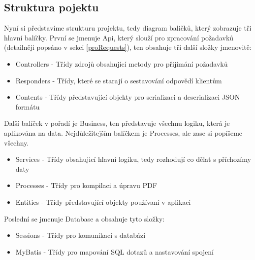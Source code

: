 \subsection{Struktura pojektu}
Nyní si představíme strukturu projektu, tedy diagram baličků, který zobrazuje tři hlavní balíčky. První se jmenuje Api, který slouží pro zpracování požadavků (detailněji popsáno v sekci \ref{proRequests}), ten obsahuje tři další složky jmenovitě:
\begin{itemize}
	\item Controllers - Třídy zdrojů obsahující metody pro přijímání požadavků
	\item Responders - Třídy, které se starají o sestavování odpovědí klientům
	\item Contents - Třídy představující objekty pro serializaci a deserializaci JSON formátu
\end{itemize}
Další balíček v pořadí je Business, ten představuje všechnu logiku, která je aplikována na data. Nejdůležitejším balíčkem je Processes, ale zase si popíšeme všechny.
\begin{itemize}
	\item Services - Třídy obsahujicí hlavní logiku, tedy rozhodují co dělat s příchozímy daty
	\item Processes - Třídy pro kompilaci a úpravu PDF
	\item Entities - Třídy představující objekty používaní v aplikaci
\end{itemize}
Poslední se jmenuje Database a obsahuje tyto složky:
\begin{itemize}
	\item Sessions - Třídy pro komunikaci s databází 
	\item MyBatis - Třídy pro mapování SQL dotazů a nastavování spojení
\end{itemize}

